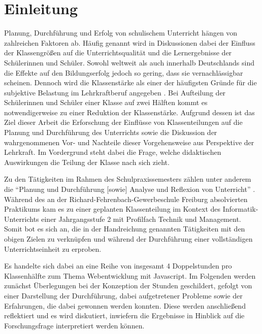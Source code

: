 \section{Einleitung}

Planung, Durchführung und Erfolg von schulischem Unterricht hängen von zahlreichen Faktoren ab.
Häufig genannt wird in Diskussionen dabei der Einfluss der Klassengrößen auf die Unterrichtsqualität und die Lernergebnisse der Schülerinnen und Schüler.
Sowohl weltweit \cite{hattie2008visible} als auch innerhalb Deutschlands \cite[S.~13f.]{wossmann2005kleinere} sind die Effekte auf den Bildungserfolg jedoch so gering, dass sie vernachlässigbar scheinen.
Dennoch wird die Klassenstärke als einer der häufigsten Gründe für die subjektive Belastung im Lehrkraftberuf angegeben \cite{bauer2003burn}.
Bei Aufteilung der Schülerinnen und Schüler einer Klasse auf zwei Hälften kommt es notwendigerweise zu einer Reduktion der Klassenstärke.
Aufgrund dessen ist das Ziel dieser Arbeit die Erforschung der Einflüsse von Klassenteilungen auf die Planung und Durchführung des Unterrichts sowie die Diskussion der wahrgenommenen Vor- und Nachteile dieser Vorgehensweise aus Perspektive der Lehrkraft.
Im Vordergrund steht dabei die Frage, welche didaktischen Auswirkungen die Teilung der Klasse nach sich zieht.

Zu den Tätigkeiten im Rahmen des Schulpraxissemesters zählen unter anderem die ``Planung und Durchführung [sowie] Analyse und Reflexion von Unterricht'' \cite[§7]{handreichung-praxissemester}.
Während des an der Richard-Fehrenbach-Gewerbeschule Freiburg absolvierten Praktikums kam es zu einer geplanten Klassenteilung im Kontext des Informatik-Unterrichts einer Jahrgangsstufe 2 mit Profilfach Technik und Management.
Somit bot es sich an, die in der Handreichung genannten Tätigkeiten mit den obigen Zielen zu verknüpfen und während der Durchführung einer vollständigen Unterrichtseinheit zu erproben.

Es handelte sich dabei an eine Reihe von insgesamt 4 Doppelstunden pro Klassenhälfte zum Thema Webentwicklung mit Javascript.
Im Folgenden werden zunächst Überlegungen bei der Konzeption der Stunden geschildert, gefolgt von einer Darstellung der Durchführung, dabei aufgetretener Probleme sowie der Erfahrungen, die dabei gewonnen werden konnten.
Diese werden anschließend reflektiert und es wird diskutiert, inwiefern die Ergebnisse in Hinblick auf die Forschungsfrage interpretiert werden können.